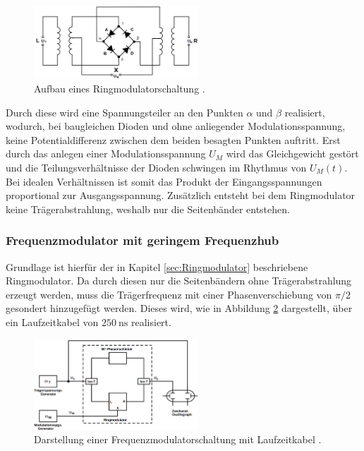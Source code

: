 \begin{figure}
    \centering
    \includegraphics[width=0.55\textwidth]{ressources/A2.png}
    \caption{Aufbau eines Ringmodulatorschaltung \cite{skript}.}
    \label{fig_02}
\end{figure}

Durch diese wird eine Spannungsteiler an den Punkten $\alpha$ und $\beta$ realisiert, wodurch, bei baugleichen Dioden und ohne anliegender Modulationsspannung, keine Potentialdifferenz zwischen dem beiden besagten Punkten auftritt. Erst durch das anlegen einer Modulationsspannung $U_M$ wird das Gleichgewicht gestört und die Teilungsverhältnisse der Dioden schwingen im Rhythmus von $U_M(t)$. Bei idealen Verhältnissen ist somit das Produkt der Eingangsspannungen proportional zur Ausgangsspannung. Zusätzlich entsteht bei dem Ringmodulator keine Trägerabstrahlung, weshalb nur die Seitenbänder entstehen.

\subsubsection{Frequenzmodulator mit geringem Frequenzhub}
\label{sec:Frequenzmodulator_mit_geringem_Frequenzhub}
Grundlage ist hierfür der in Kapitel \ref{sec:Ringmodulator} beschriebene Ringmodulator. Da durch diesen nur die Seitenbändern ohne Trägerabstrahlung erzeugt werden, muss die Trägerfrequenz mit einer Phasenverschiebung von $\pi/2$ gesondert hinzugefügt werden. Dieses wird, wie in Abbildung \ref{fig_03} dargestellt, über ein Laufzeitkabel von $\SI{250}{\ns}$ realisiert. 

\begin{figure}
    \centering
    \includegraphics[width=0.55\textwidth]{ressources/A3.png}
    \caption{Darstellung einer Frequenzmodulatorschaltung mit Laufzeitkabel \cite{skript}.}
    \label{fig_03}
\end{figure}


